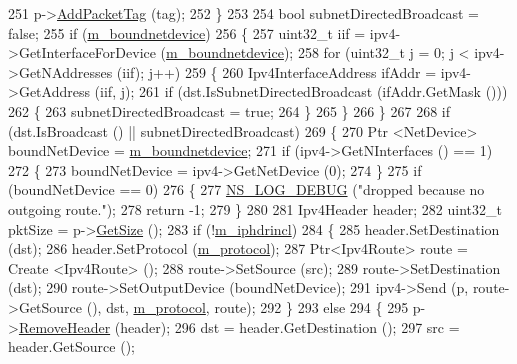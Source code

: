 \begin{DoxyCode}
251       p->\hyperlink{classns3_1_1Packet_a7400b8655852f5271c5957250d0141af}{AddPacketTag} (tag);
252     \}
253 
254   \textcolor{keywordtype}{bool} subnetDirectedBroadcast = \textcolor{keyword}{false};
255   \textcolor{keywordflow}{if} (\hyperlink{classns3_1_1Socket_a9781d8dfdb5e9364d5dce8f53b768bb5}{m\_boundnetdevice})
256     \{
257       uint32\_t iif = ipv4->GetInterfaceForDevice (\hyperlink{classns3_1_1Socket_a9781d8dfdb5e9364d5dce8f53b768bb5}{m\_boundnetdevice});
258       \textcolor{keywordflow}{for} (uint32\_t j = 0; j < ipv4->GetNAddresses (iif); j++)
259         \{
260           Ipv4InterfaceAddress ifAddr = ipv4->GetAddress (iif, j);
261           \textcolor{keywordflow}{if} (dst.IsSubnetDirectedBroadcast (ifAddr.GetMask ()))
262             \{
263               subnetDirectedBroadcast = \textcolor{keyword}{true};
264             \}
265         \}
266     \}
267 
268   \textcolor{keywordflow}{if} (dst.IsBroadcast () || subnetDirectedBroadcast)
269     \{
270       Ptr <NetDevice> boundNetDevice = \hyperlink{classns3_1_1Socket_a9781d8dfdb5e9364d5dce8f53b768bb5}{m\_boundnetdevice};
271       \textcolor{keywordflow}{if} (ipv4->GetNInterfaces () == 1)
272         \{
273           boundNetDevice = ipv4->GetNetDevice (0);
274         \}
275       \textcolor{keywordflow}{if} (boundNetDevice == 0)
276         \{
277           \hyperlink{group__logging_ga413f1886406d49f59a6a0a89b77b4d0a}{NS\_LOG\_DEBUG} (\textcolor{stringliteral}{"dropped because no outgoing route."});
278           \textcolor{keywordflow}{return} -1;
279         \}
280 
281       Ipv4Header header;
282       uint32\_t pktSize = p->\hyperlink{classns3_1_1Packet_a462855c9929954d4301a4edfe55f4f1c}{GetSize} ();
283       \textcolor{keywordflow}{if} (!\hyperlink{classns3_1_1Ipv4RawSocketImpl_a895d0929c6fb2c111f99e83a8b7516fc}{m\_iphdrincl})
284         \{
285           header.SetDestination (dst);
286           header.SetProtocol (\hyperlink{classns3_1_1Ipv4RawSocketImpl_a924effb0eb9a6cbbf1daeb3a7b7ffc94}{m\_protocol});
287           Ptr<Ipv4Route> route = Create <Ipv4Route> ();
288           route->SetSource (src);
289           route->SetDestination (dst);
290           route->SetOutputDevice (boundNetDevice);
291           ipv4->Send (p, route->GetSource (), dst, \hyperlink{classns3_1_1Ipv4RawSocketImpl_a924effb0eb9a6cbbf1daeb3a7b7ffc94}{m\_protocol}, route);
292         \}
293       \textcolor{keywordflow}{else}
294         \{
295           p->\hyperlink{classns3_1_1Packet_a0961eccf975d75f902d40956c93ba63e}{RemoveHeader} (header);
296           dst = header.GetDestination ();
297           src = header.GetSource ();

\end{DoxyCode}
